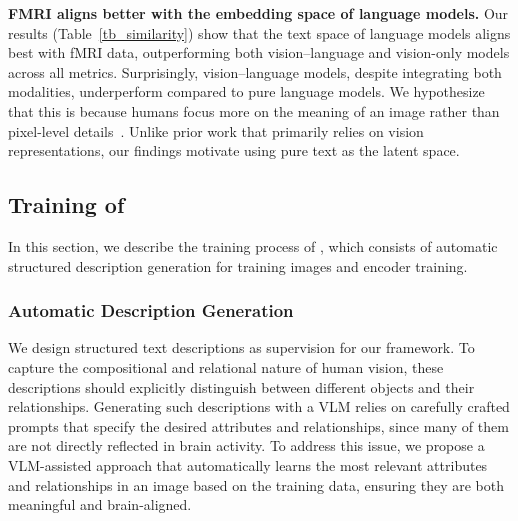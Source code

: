 \textbf{FMRI aligns better with the embedding space of language models.} Our results (Table~\ref{tb_similarity}) show that the text space of language models aligns best with fMRI data, outperforming both vision–language and vision-only models across all metrics. Surprisingly, vision–language models, despite integrating both modalities, underperform compared to pure language models. We hypothesize that this is because humans focus more on the meaning of an image rather than pixel-level details~\citep{naselaris2009bayesian, du2022fmri}. Unlike prior work \citep{scotti2023reconstructing, wang2024decoding, xia2024dream, lin2022mind} that primarily relies on vision representations, our findings motivate using pure text as the latent space.





\subsection{Training of \prism}
\label{sec: text_bridge}
In this section, we describe the training process of \prism, which consists of automatic structured description generation for training images and encoder training.

\subsubsection{Automatic Description Generation}
\label{sec:train_desc_gen}
We design structured text descriptions as supervision for our framework. To capture the compositional and relational nature of human vision, these descriptions should explicitly distinguish between different objects and their relationships. Generating such descriptions with a VLM relies on carefully crafted prompts that specify the desired attributes and relationships, since many of them are not directly reflected in brain activity. To address this issue, we propose a VLM-assisted approach that automatically learns the most relevant attributes and relationships in an image based on the training data, ensuring they are both meaningful and brain-aligned.

